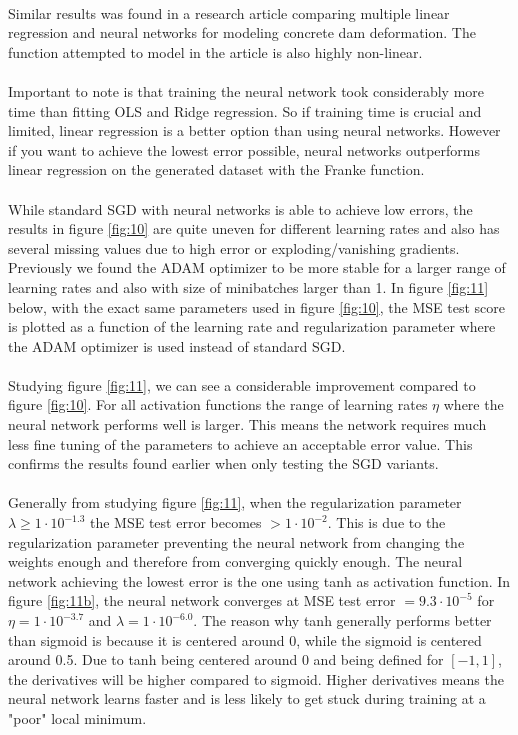 \documentclass[a4paper,twocolumn]{article}
\begin{document}
\\
Similar results was found in a research article comparing multiple linear regression and neural networks for modeling concrete dam deformation\cite{lrvsffnn}. The function attempted to model in the article is also highly non-linear.\\
\\
Important to note is that training the neural network took considerably more time than fitting OLS and Ridge regression. So if training time is crucial and limited, linear regression is a better option than using neural networks. However if you want to achieve the lowest error possible, neural networks outperforms linear regression on the generated dataset with the Franke function.\\
\\
While standard SGD with neural networks is able to achieve low errors, the results in figure \ref{fig:10} are quite uneven for different learning rates and also has several missing values due to high error or exploding/vanishing gradients. Previously we found the ADAM optimizer to be more stable for a larger range of learning rates and also with size of minibatches larger than 1. In figure \ref{fig:11} below, with the exact same parameters used in figure \ref{fig:10}, the MSE test score is plotted as a function of the learning rate and regularization parameter where the ADAM optimizer is used instead of standard SGD.\\
\\
Studying figure \ref{fig:11}, we can see a considerable improvement compared to figure \ref{fig:10}. For all activation functions the range of learning rates $\eta$ where the neural network performs well is larger. This means the network requires much less fine tuning of the parameters to achieve an acceptable error value. This confirms the results found earlier when only  testing the SGD variants.\\
\\
Generally from studying figure \ref{fig:11}, when the regularization parameter $\lambda \geq 1\cdot 10^{-1.3}$ the MSE test error becomes $> 1\cdot 10^{-2}$. This is due to the regularization parameter preventing the neural network from changing the weights enough and therefore from converging quickly enough. The neural network achieving the lowest error is the one using tanh as activation function. In figure \ref{fig:11b}, the neural network converges at MSE test error $= 9.3\cdot 10^{-5}$ for $\eta = 1\cdot 10^{-3.7}$ and $\lambda = 1\cdot 10^{-6.0}$. The reason why tanh generally performs better than sigmoid is because it is centered around 0, while the sigmoid is centered around 0.5. Due to tanh being centered around 0 and being defined for $[-1, 1]$, the derivatives will be higher compared to sigmoid. Higher derivatives means the neural network learns faster and is less likely to get stuck during training at a "poor" local minimum. \\
\end{document}
